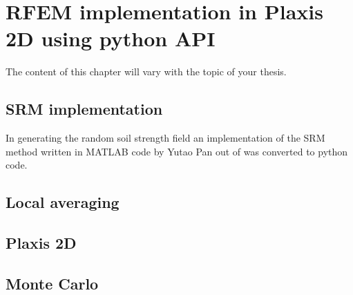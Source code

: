 \chapter[RFEM implementation in Plaxis 2D using python API]{RFEM implementation in Plaxis 2D using python API}
The content of this chapter will vary with the topic of your thesis. 


\section{SRM implementation}

In generating the random soil strength field an implementation of the SRM method written in MATLAB code by Yutao Pan out of \citet*{deodatis1990stochastic} was converted to python code.

\section{Local averaging}

\section{Plaxis 2D}

\section{Monte Carlo}






